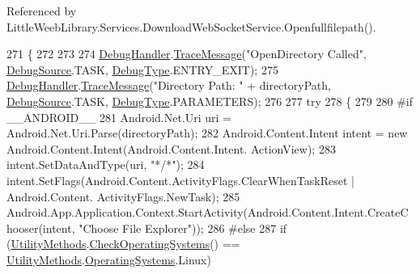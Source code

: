 Referenced by Little\+Weeb\+Library.\+Services.\+Download\+Web\+Socket\+Service.\+Openfullfilepath().


\begin{DoxyCode}
271         \{
272 
273 
274             \mbox{\hyperlink{class_little_weeb_library_1_1_handlers_1_1_directory_handler_adb882b8ec72046e2b95b6d11228f6927}{DebugHandler}}.\mbox{\hyperlink{interface_little_weeb_library_1_1_handlers_1_1_i_debug_handler_a2e405bc3492e683cd3702fae125221bc}{TraceMessage}}(\textcolor{stringliteral}{"OpenDirectory Called"}, 
      \mbox{\hyperlink{namespace_little_weeb_library_1_1_handlers_a2a6ca0775121c9c503d58aa254d292be}{DebugSource}}.TASK, \mbox{\hyperlink{namespace_little_weeb_library_1_1_handlers_ab66019ed40462876ec4e61bb3ccb0a62}{DebugType}}.ENTRY\_EXIT);
275             \mbox{\hyperlink{class_little_weeb_library_1_1_handlers_1_1_directory_handler_adb882b8ec72046e2b95b6d11228f6927}{DebugHandler}}.\mbox{\hyperlink{interface_little_weeb_library_1_1_handlers_1_1_i_debug_handler_a2e405bc3492e683cd3702fae125221bc}{TraceMessage}}(\textcolor{stringliteral}{"Directory Path: "} + directoryPath, 
      \mbox{\hyperlink{namespace_little_weeb_library_1_1_handlers_a2a6ca0775121c9c503d58aa254d292be}{DebugSource}}.TASK, \mbox{\hyperlink{namespace_little_weeb_library_1_1_handlers_ab66019ed40462876ec4e61bb3ccb0a62}{DebugType}}.PARAMETERS);
276 
277             \textcolor{keywordflow}{try}
278             \{
279 
280 \textcolor{preprocessor}{#if \_\_ANDROID\_\_}
281                 Android.Net.Uri uri = Android.Net.Uri.Parse(directoryPath);
282                 Android.Content.Intent intent = \textcolor{keyword}{new} Android.Content.Intent(Android.Content.Intent.
      ActionView);
283                 intent.SetDataAndType(uri, \textcolor{stringliteral}{"*/*"});
284                 intent.SetFlags(Android.Content.ActivityFlags.ClearWhenTaskReset | Android.Content.
      ActivityFlags.NewTask);
285                 Android.App.Application.Context.StartActivity(Android.Content.Intent.CreateChooser(intent, \textcolor{stringliteral}{
      "Choose File Explorer"}));
286 \textcolor{preprocessor}{#else}
287                 \textcolor{keywordflow}{if} (\mbox{\hyperlink{class_little_weeb_library_1_1_static_classes_1_1_utility_methods}{UtilityMethods}}.\mbox{\hyperlink{class_little_weeb_library_1_1_static_classes_1_1_utility_methods_afc8c716f32bc35d59afdb287be06c3ca}{CheckOperatingSystems}}() == 
      \mbox{\hyperlink{class_little_weeb_library_1_1_static_classes_1_1_utility_methods}{UtilityMethods}}.\mbox{\hyperlink{class_little_weeb_library_1_1_static_classes_1_1_utility_methods_aad4a2807f22b8cb65b8db3cdc981a0b1}{OperatingSystems}}.Linux)

\end{DoxyCode}
